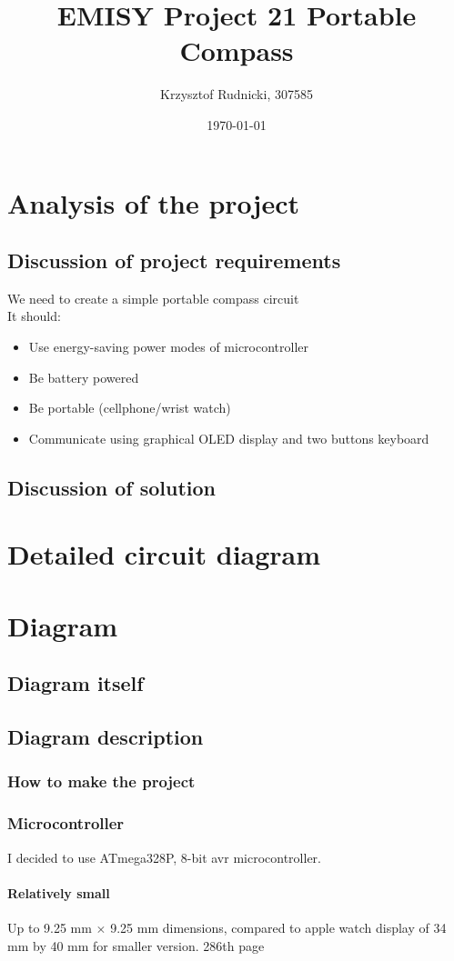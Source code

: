\documentclass{article}
\title{EMISY Project 21 Portable Compass}
\author{Krzysztof Rudnicki, 307585}
\date{\today}
\begin{document}

\maketitle
\section{Analysis of the project}
\subsection{Discussion of project requirements}
We need to create a simple portable compass circuit \\
It should:
\begin{itemize}
	\item Use energy-saving power modes of microcontroller
	\item Be battery powered
	\item Be portable (cellphone/wrist watch)
	\item Communicate using graphical OLED display and two buttons keyboard
\end{itemize}
\subsection{Discussion of solution}
\section{Detailed circuit diagram}
\section{Diagram}
\subsection{Diagram itself}
\subsection{Diagram description}
\subsubsection{How to make the project}
\subsubsection{Microcontroller}
I decided to use ATmega328P, 8-bit avr microcontroller.
\paragraph{Relatively small} Up to 9.25 mm $\times$ 9.25 mm dimensions, 
compared to apple watch display of 34 mm by 40 mm for smaller version. 
\cite{datasheet}
286th page
\end{document}
